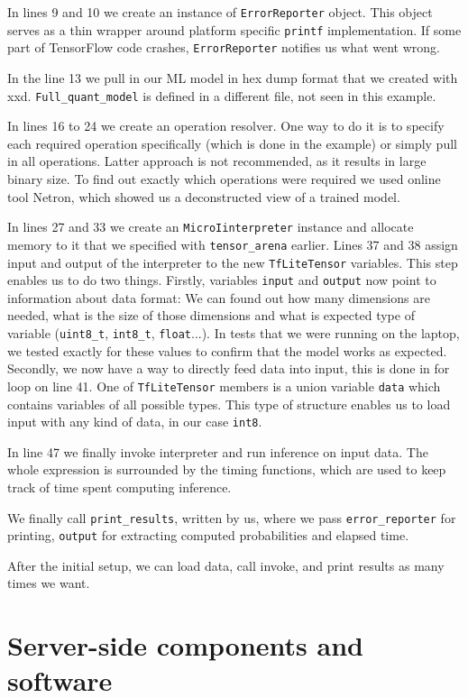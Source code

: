 In lines 9 and 10 we create an instance of \verb|ErrorReporter| object.
This object serves as a thin wrapper around platform specific \verb|printf| implementation.
If some part of TensorFlow code crashes, \verb|ErrorReporter| notifies us what went wrong.

In the line 13 we pull in our ML model in hex dump format that we created with xxd.
\verb|Full_quant_model| is defined in a different file, not seen in this example.

In lines 16 to 24 we create an operation resolver.
One way to do it is to specify each required operation specifically (which is done in the example) or simply pull in all operations.
Latter approach is not recommended, as it results in large binary size.
To find out exactly which operations were required we used online tool Netron\cite{netron}, which showed us a deconstructed view of a trained model.

In lines 27 and 33 we create an \verb|MicroIinterpreter| instance and allocate memory to it that we specified with \verb|tensor_arena| earlier.
Lines 37 and 38 assign input and output of the interpreter to the new \verb|TfLiteTensor| variables.
This step enables us to do two things.
Firstly, variables \verb|input| and \verb|output| now point to information about data format: We can found out how many dimensions are needed, what is the size of those dimensions and what is expected type of variable (\verb|uint8_t|, \verb|int8_t|, \verb|float|...).
In tests that we were running on the laptop, we tested exactly for these values to confirm that the model works as expected.
Secondly, we now have a way to directly feed data into input, this is done in for loop on line 41.
One of \verb|TfLiteTensor| members is a union variable \verb|data| which contains variables of all possible types.
This type of structure enables us to load input with any kind of data, in our case \verb|int8|.

In line 47 we finally invoke interpreter and run inference on input data.
The whole expression is surrounded by the timing functions, which are used to keep track of time spent computing inference.

We finally call \verb|print_results|, written by us, where we pass \verb|error_reporter| for printing, \verb|output| for extracting computed probabilities and elapsed time.

After the initial setup, we can load data, call invoke, and print results as many times we want.


\section{ Server-side components and software}

